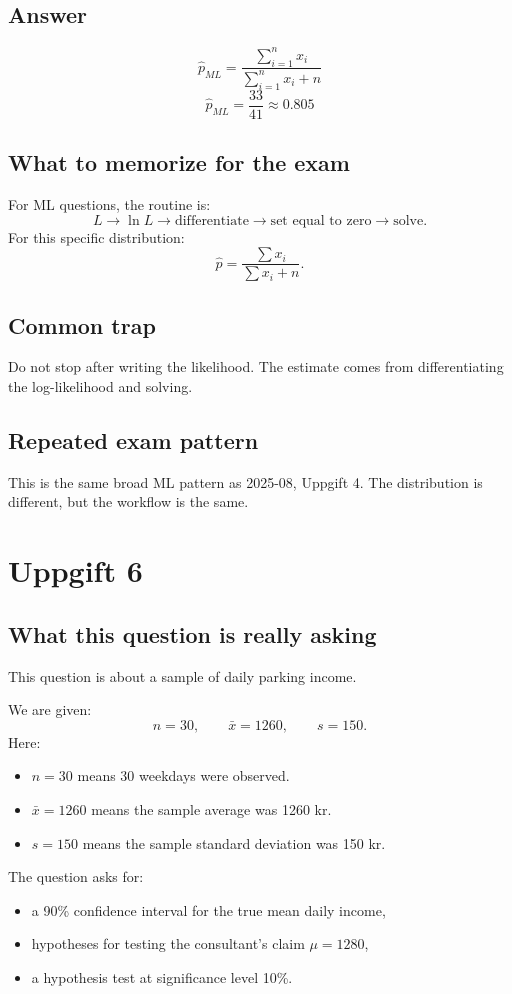 \documentclass[11pt,a4paper]{article}
\begin{document}
\subsection*{Answer}
\[
\boxed{\hat p_{ML}=\frac{\sum_{i=1}^n x_i}{\sum_{i=1}^n x_i+n}}
\]
\[
\boxed{\hat p_{ML}=\frac{33}{41}\approx 0.805}
\]

\subsection*{What to memorize for the exam}
For ML questions, the routine is:
\[
L \rightarrow \ln L \rightarrow \text{differentiate} \rightarrow \text{set equal to zero} \rightarrow \text{solve}.
\]
For this specific distribution:
\[
\hat p=\frac{\sum x_i}{\sum x_i+n}.
\]

\subsection*{Common trap}
Do not stop after writing the likelihood. The estimate comes from differentiating the log-likelihood and solving.

\subsection*{Repeated exam pattern}
This is the same broad ML pattern as 2025-08, Uppgift 4. The distribution is different, but the workflow is the same.

\section*{Uppgift 6}

\subsection*{What this question is really asking}
This question is about a sample of daily parking income.

We are given:
\[
n=30,\qquad \bar{x}=1260,\qquad s=150.
\]
Here:
\begin{itemize}[leftmargin=*]
    \item \(n=30\) means 30 weekdays were observed.
    \item \(\bar{x}=1260\) means the sample average was 1260 kr.
    \item \(s=150\) means the sample standard deviation was 150 kr.
\end{itemize}

The question asks for:
\begin{itemize}[leftmargin=*]
    \item a 90\% confidence interval for the true mean daily income,
    \item hypotheses for testing the consultant's claim \(\mu=1280\),
    \item a hypothesis test at significance level 10\%.
\end{itemize}
\end{document}
